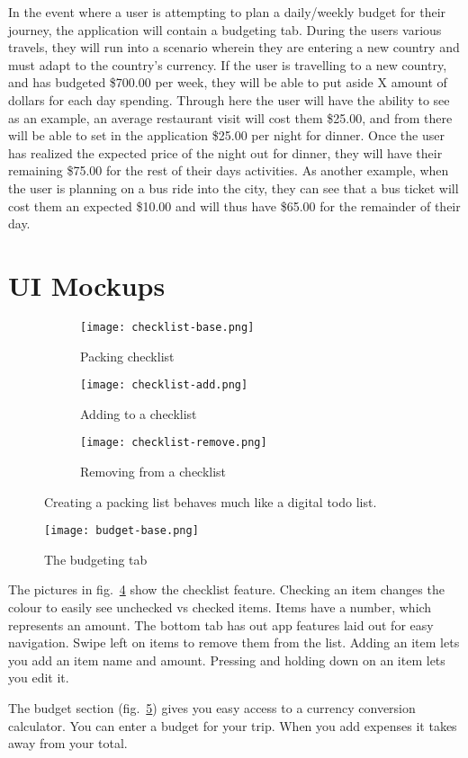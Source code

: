 \documentclass[12pt]{article}
\begin{document}
	In the event where a user is attempting to plan a daily/weekly budget for their journey,
	the application will contain a budgeting tab.
	During the users various travels,
	they will run into a scenario wherein they are entering a new country and must adapt to the country's currency.
	If the user is travelling to a new country, and has budgeted \$700.00 per week,
	they will be able to put aside X amount of dollars for each day spending.
	Through here the user will have the ability to see as an example,
	an average restaurant visit will cost them \$25.00,
	and from there will be able to set in the application \$25.00 per night for dinner.
	Once the user has realized the expected price of the night out for dinner,
	they will have their remaining \$75.00 for the rest of their days activities.
	As another example, when the user is planning on a bus ride into the city,
	they can see that a bus ticket will cost them an expected \$10.00
	and will thus have \$65.00 for the remainder of their day.

	\pagebreak

\section*{UI Mockups}

	\begin{figure}[!hb]
		\centering
		\begin{subfigure}{0.15\linewidth}
			\texttt{[image: checklist-base.png]}
			\caption{Packing checklist}
			\label{fig:checklist-base}
		\end{subfigure}
		\begin{subfigure}{0.15\linewidth}
			\texttt{[image: checklist-add.png]}
			\caption{Adding to a checklist}
			\label{fig:checklist-add}
		\end{subfigure}
		\begin{subfigure}{0.15\linewidth}
			\texttt{[image: checklist-remove.png]}
			\caption{Removing from a checklist}
			\label{fig:checklist-remove}
		\end{subfigure}
		\caption{Creating a packing list behaves much like a digital todo list.}
		\label{fig:checklist}
	\end{figure}

	\begin{figure}
		\centering
		\texttt{[image: budget-base.png]}
		\caption{The budgeting tab}
		\label{fig:budget}
	\end{figure}

    The pictures in fig.~\ref{fig:checklist} show the checklist feature.
	Checking an item changes the colour to easily see unchecked vs checked items.
    Items have a number, which represents an amount.
    The bottom tab has out app features laid out for easy navigation.
    Swipe left on items to remove them from the list.
    Adding an item lets you add an item name and amount.
    Pressing and holding down on an item lets you edit it.

    The budget section (fig.~\ref{fig:budget}) gives you easy access to a currency conversion calculator.
    You can enter a budget for your trip.
    When you add expenses it takes away from your total.
\end{document}

